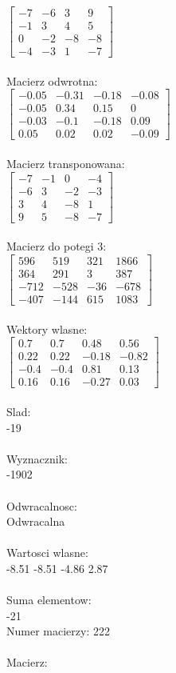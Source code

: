 \documentclass[a4paper,12pt]{article}
\begin{document}
$\begin{bmatrix} -7&-6&3&9\\-1&3&4&5\\0&-2&-8&-8\\-4&-3&1&-7 \end{bmatrix}$
\\
\\
Macierz odwrotna:\\

$\begin{bmatrix} -0.05&-0.31&-0.18&-0.08\\-0.05&0.34&0.15&0\\-0.03&-0.1&-0.18&0.09\\0.05&0.02&0.02&-0.09 \end{bmatrix}$
\\
\\
Macierz transponowana:\\

$\begin{bmatrix} -7&-1&0&-4\\-6&3&-2&-3\\3&4&-8&1\\9&5&-8&-7 \end{bmatrix}$
\\
\\
Macierz do potegi 3:\\

$\begin{bmatrix} 596&519&321&1866\\364&291&3&387\\-712&-528&-36&-678\\-407&-144&615&1083 \end{bmatrix}$
\\
\\
Wektory wlasne:\\

$\begin{bmatrix} 0.7&0.7&0.48&0.56\\0.22&0.22&-0.18&-0.82\\-0.4&-0.4&0.81&0.13\\0.16&0.16&-0.27&0.03 \end{bmatrix}$
\\
\\
Slad:\\
-19
\\
\\
Wyznacznik:\\
-1902
\\
\\
Odwracalnosc:\\
Odwracalna
\\
\\
Wartosci wlasne:\\
-8.51 -8.51 -4.86 2.87
\\
\\
Suma elementow:\\
-21
\\
\newpage
Numer macierzy:
222
\\
\\
Macierz:\\
\end{document}
